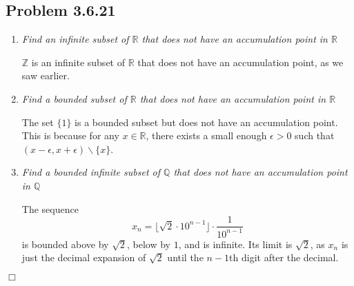 \documentclass[
]{article}
\begin{document}
\hypertarget{problem-3.6.21}{%
\subsection{Problem 3.6.21}\label{problem-3.6.21}}

\begin{enumerate}
\item \textit{Find an infinite subset of $\mathbb{R}$ that does not have an accumulation point in $\mathbb{R}$}  
  
$\mathbb{Z}$ is an infinite subset of $\mathbb{R}$ that does not have an accumulation point, as we saw earlier. 
\item \textit{Find a bounded subset of $\mathbb{R}$ that does not have an accumulation point in $\mathbb{R}$}  
  
The set $\{1\}$ is a bounded subset but does not have an accumulation point. This is because for any $x \in \mathbb{R}$, there exists a small enough $\epsilon > 0$ such that $(x - \epsilon, x + \epsilon) \backslash \{x\}$. 
\item \textit{Find a bounded infinite subset of $\mathbb{Q}$ that does not have an accumulation point in $\mathbb{Q}$}  
  
The sequence \[x_n = \lfloor \sqrt 2 \cdot  10 ^{n-1}\rfloor \cdot \frac{1}{10^{n-1}}\]
is bounded above by $\sqrt 2$, below by $1$, and is infinite. Its limit is $\sqrt 2$, as $x_n$ is just the decimal expansion of $\sqrt 2$ until the $n-1$th digit after the decimal. 
\end{enumerate}

\hfill \(\Box\)
\end{document}
